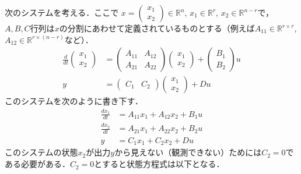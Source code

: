次のシステムを考える．ここで
$x = \left(\begin{array}{c} {x}_1 \\ {x}_2 \end{array}\right) \in {\mathbb R}^n$, 
$x_1 \in {\mathbb R}^r$, $x_2 \in {\mathbb R}^{n-r}$で，$A,B,C$行列は$x$の分割にあわせて定義されているものとする（例えば$A_{11} \in {\mathbb R}^{r \times r}$, $A_{12} \in {\mathbb R}^{r \times (n-r)}$など）．
\begin{align}
 \frac{d}{dt}
  \left(\begin{array}{c}
         {x}_1 \\
   {x}_2
  \end{array}\right)
  &=
  \left(\begin{array}{cc}
         {A}_{11} & {A}_{12} \\
       {A}_{21} & {A}_{22}
  \end{array}\right)
  \left(\begin{array}{c}
         {x}_1 \\
   {x}_2
  \end{array}\right)
  +
  \left(\begin{array}{c}
         {B}_1 \\
   {B}_2
  \end{array}\right)
  u \\
 y &=
  \left(\begin{array}{cc}
         {C}_1 & C_2
  \end{array}\right)
  \left(\begin{array}{c}
         {x}_1 \\
   {x}_2
  \end{array}\right)
  + D u
\end{align}
このシステムを次のように書き下す．
\begin{align}
 \frac{dx_1}{dt} &= A_{11} x_1 + A_{12} x_2 + B_1 u
\label{eq:observable1} \\
 \frac{dx_2}{dt} &= A_{21} x_1 + A_{22} x_2 + B_2 u
\label{eq:observable2} \\
 y & = C_1 x_1 + C_2 x_2+ Du
\label{eq:observable03}
\end{align}
このシステムの状態$x_2$が出力$y$から見えない（観測できない）ためには$C_2=0$である必要がある．$C_2=0$とすると状態方程式は以下となる．
